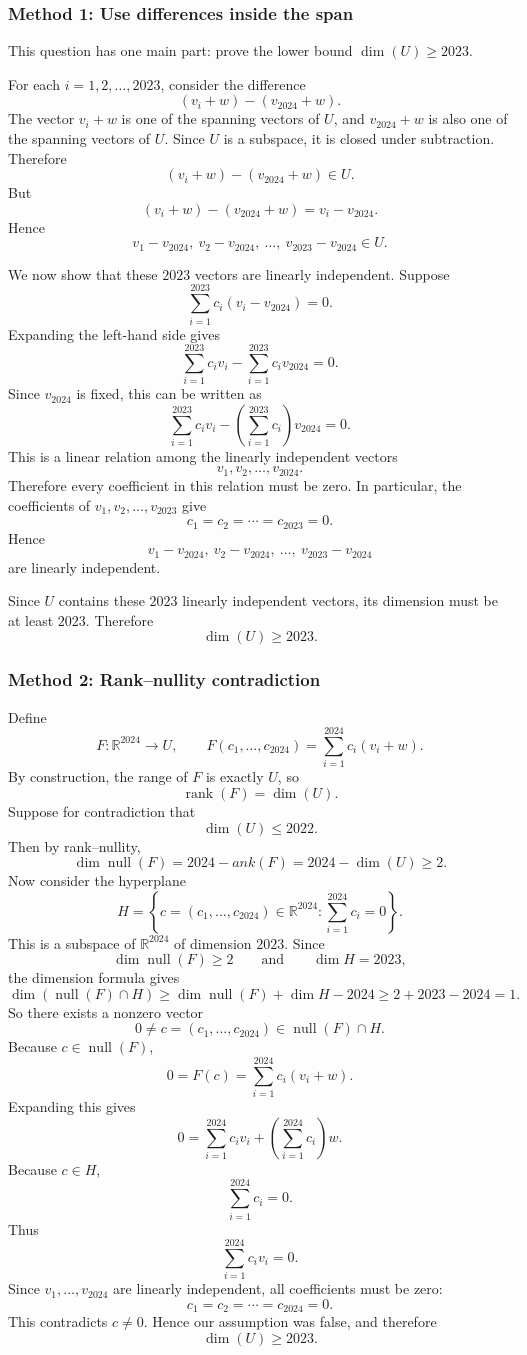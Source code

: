 \documentclass[12pt]{article}
\newcommand{\R}{\mathbb{R}}
\newcommand{\Null}{\operatorname{null}}
\newcommand{\rank}{\operatorname{rank}}
\begin{document}
\subsubsection{Method 1: Use differences inside the span}

This question has one main part: prove the lower bound $\dim(U)\ge2023$.

For each $i=1,2,\ldots,2023$, consider the difference
\[
(v_i+w)-(v_{2024}+w).
\]
The vector $v_i+w$ is one of the spanning vectors of $U$, and $v_{2024}+w$ is also one of the spanning vectors of $U$. Since $U$ is a subspace, it is closed under subtraction. Therefore
\[
(v_i+w)-(v_{2024}+w)\in U.
\]
But
\[
(v_i+w)-(v_{2024}+w)=v_i-v_{2024}.
\]
Hence
\[
v_1-v_{2024},\ v_2-v_{2024},\ \ldots,\ v_{2023}-v_{2024}\in U.
\]

We now show that these $2023$ vectors are linearly independent. Suppose
\[
\sum_{i=1}^{2023}c_i(v_i-v_{2024})=0.
\]
Expanding the left-hand side gives
\[
\sum_{i=1}^{2023}c_i v_i-\sum_{i=1}^{2023}c_i v_{2024}=0.
\]
Since $v_{2024}$ is fixed, this can be written as
\[
\sum_{i=1}^{2023}c_i v_i-
\left(\sum_{i=1}^{2023}c_i\right)v_{2024}=0.
\]
This is a linear relation among the linearly independent vectors
\[
v_1,v_2,\ldots,v_{2024}.
\]
Therefore every coefficient in this relation must be zero. In particular, the coefficients of $v_1,v_2,\ldots,v_{2023}$ give
\[
c_1=c_2=\cdots=c_{2023}=0.
\]
Hence
\[
v_1-v_{2024},\ v_2-v_{2024},\ \ldots,\ v_{2023}-v_{2024}
\]
are linearly independent.

Since $U$ contains these $2023$ linearly independent vectors, its dimension must be at least $2023$. Therefore
\[
\boxed{\dim(U)\ge2023.}
\]

\subsubsection{Method 2: Rank--nullity contradiction}

Define
\[
F:\R^{2024}\to U,
\qquad
F(c_1,\ldots,c_{2024})=\sum_{i=1}^{2024}c_i(v_i+w).
\]
By construction, the range of $F$ is exactly $U$, so
\[
\rank(F)=\dim(U).
\]
Suppose for contradiction that
\[
\dim(U)\le2022.
\]
Then by rank--nullity,
\[
\dim\Null(F)=2024-
ank(F)
=2024-
\dim(U)
\ge2.
\]
Now consider the hyperplane
\[
H=\left\{c=(c_1,\ldots,c_{2024})\in\R^{2024}:\sum_{i=1}^{2024}c_i=0\right\}.
\]
This is a subspace of $\R^{2024}$ of dimension $2023$. Since
\[
\dim\Null(F)\ge2
\qquad\text{and}\qquad
\dim H=2023,
\]
the dimension formula gives
\[
\dim(\Null(F)\cap H)
\ge \dim\Null(F)+\dim H-2024
\ge 2+2023-2024=1.
\]
So there exists a nonzero vector
\[
0\neq c=(c_1,\ldots,c_{2024})\in\Null(F)\cap H.
\]
Because $c\in\Null(F)$,
\[
0=F(c)=\sum_{i=1}^{2024}c_i(v_i+w).
\]
Expanding this gives
\[
0=\sum_{i=1}^{2024}c_i v_i+
\left(\sum_{i=1}^{2024}c_i\right)w.
\]
Because $c\in H$,
\[
\sum_{i=1}^{2024}c_i=0.
\]
Thus
\[
\sum_{i=1}^{2024}c_i v_i=0.
\]
Since $v_1,\ldots,v_{2024}$ are linearly independent, all coefficients must be zero:
\[
c_1=c_2=\cdots=c_{2024}=0.
\]
This contradicts $c\neq0$. Hence our assumption was false, and therefore
\[
\boxed{\dim(U)\ge2023.}
\]
\end{document}
